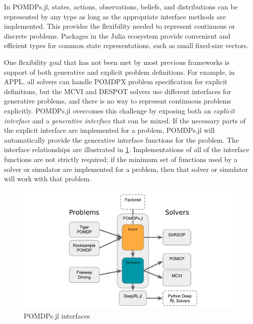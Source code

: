 In POMDPs.jl, states, actions, observations, beliefs, and distributions can be represented by any type as long as the appropriate interface methods are implemented.
This provides the flexibility needed to represent continuous or discrete problems.
Packages in the Julia ecosystem provide convenient and efficient types for common state representations, such as small fixed-size vectors.

One flexibility goal that has not been met by most previous frameworks is support of both generative and explicit problem definitions.
For example, in APPL, all solvers can handle POMDPX problem specification for explicit definitions, but the MCVI and DESPOT solvers use different interfaces for generative problems, and there is no way to represent continuous problems explicitly.
POMDPs.jl overcomes this challenge by exposing both an \emph{explicit interface} and a \emph{generative interface} that can be mixed.
If the necessary parts of the explicit interface are implemented for a problem, POMDPs.jl will automatically provide the generative interface functions for the problem.
The interface relationships are illustrated in \cref{fig:interfaces}.
Implementations of all of the interface functions are not strictly required; if the minimum set of functions used by a solver or simulator are implemented for a problem, then that solver or simulator will work with that problem.

\begin{figure}[htpb]
    \centering
    \includegraphics[width=0.8\linewidth]{media/interfaces.pdf}
    \caption{POMDPs.jl interfaces}
    \label{fig:interfaces}
\end{figure}

